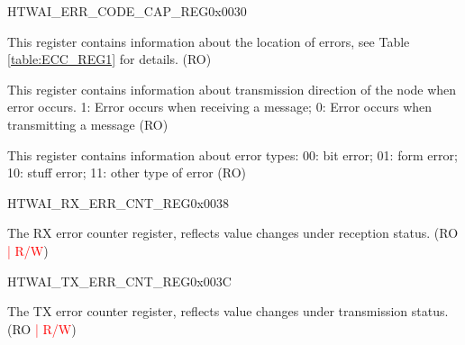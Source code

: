 \begin{register}{H}{TWAI\_ERR\_CODE\_CAP\_REG}{0x0030}\label{regdesc:TWAIERRCODECAPREG}
%
%
%
%
\regnewline%
\begin{regdesc}\begin{reglist}
\label{fielddesc:TWAIECCSEGMENT}\item [TWAI\_ECC\_SEGMENT] This register contains information about the location of errors, see Table \ref{table:ECC_REG1} for details. (RO)
\label{fielddesc:TWAIECCDIRECTION}\item [TWAI\_ECC\_DIRECTION] This register contains information about transmission direction of the node when error occurs. 1: Error occurs when receiving a message; 0: Error occurs when transmitting a message (RO)
\label{fielddesc:TWAIECCTYPE}\item [TWAI\_ECC\_TYPE] This register contains information about error types:
00: bit error; 01: form error; 10: stuff error; 11: other type of error (RO)
\end{reglist}\end{regdesc}
\end{register}


\begin{register}{H}{TWAI\_RX\_ERR\_CNT\_REG}{0x0038}\label{regdesc:TWAIRXERRCNTREG}
%
%
\regnewline%
\begin{regdesc}\begin{reglist}
\label{fielddesc:TWAIRXERRCNT}\item [TWAI\_RX\_ERR\_CNT] The RX error counter register, reflects value changes under reception status. (RO \textcolor{red}{| R/W})
\end{reglist}\end{regdesc}
\end{register}


\begin{register}{H}{TWAI\_TX\_ERR\_CNT\_REG}{0x003C}\label{regdesc:TWAITXERRCNTREG}
%
%
\regnewline%
\begin{regdesc}\begin{reglist}
\label{fielddesc:TWAITXERRCNT}\item [TWAI\_TX\_ERR\_CNT] The TX error counter register, reflects value changes under transmission status. (RO \textcolor{red}{| R/W})
\end{reglist}\end{regdesc}
\end{register}



